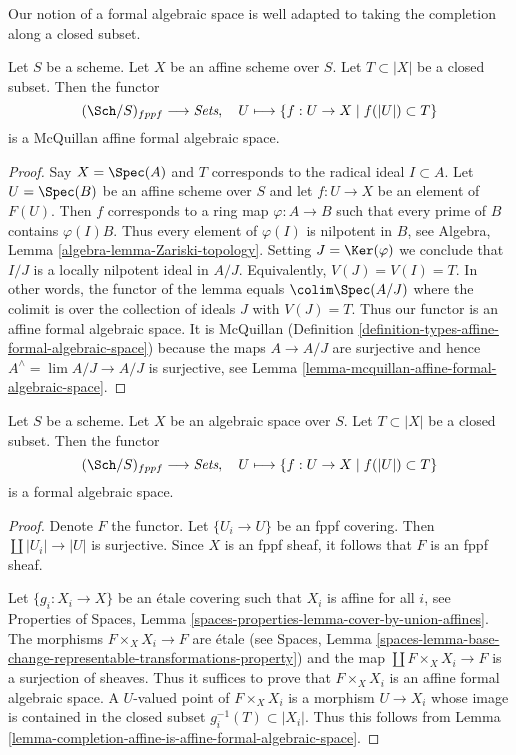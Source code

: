 \noindent
Our notion of a formal algebraic space is well adapted to taking the
completion along a closed subset.

\begin{lemma}
\label{lemma-completion-affine-is-affine-formal-algebraic-space}
Let $S$ be a scheme. Let $X$ be an affine scheme over $S$.
Let $T \subset |X|$ be a closed subset. Then the functor
$$
(\Sch/S)_{fppf} \longrightarrow \textit{Sets},\quad
U \longmapsto \{f : U \to X \mid f(|U|) \subset T\}
$$
is a McQuillan affine formal algebraic space.
\end{lemma}

\begin{proof}
Say $X = \Spec(A)$ and $T$ corresponds to the radical ideal $I \subset A$.
Let $U = \Spec(B)$ be an affine scheme over $S$ and let
$f : U \to X$ be an element of $F(U)$. Then $f$ corresponds to a
ring map $\varphi : A \to B$ such that every prime of $B$ contains
$\varphi(I) B$. Thus every element of $\varphi(I)$ is nilpotent in $B$, see
Algebra, Lemma \ref{algebra-lemma-Zariski-topology}.
Setting $J = \Ker(\varphi)$ we conclude that $I/J$ is a locally nilpotent
ideal in $A/J$. Equivalently, $V(J) = V(I) = T$.
In other words, the functor of the lemma equals
$\colim \Spec(A/J)$ where the colimit is over the
collection of ideals $J$ with $V(J) = T$.
Thus our functor is an affine formal algebraic space. It is McQuillan
(Definition \ref{definition-types-affine-formal-algebraic-space})
because the maps $A \to A/J$ are surjective
and hence $A^\wedge = \lim A/J \to A/J$ is surjective, see
Lemma \ref{lemma-mcquillan-affine-formal-algebraic-space}.
\end{proof}

\begin{lemma}
\label{lemma-completion-is-formal-algebraic-space}
Let $S$ be a scheme. Let $X$ be an algebraic space over $S$.
Let $T \subset |X|$ be a closed subset. Then the functor
$$
(\Sch/S)_{fppf} \longrightarrow \textit{Sets},\quad
U \longmapsto \{f : U \to X \mid f(|U|) \subset T\}
$$
is a formal algebraic space.
\end{lemma}

\begin{proof}
Denote $F$ the functor. Let $\{U_i \to U\}$ be an fppf covering.
Then $\coprod |U_i| \to |U|$ is surjective. Since $X$ is an fppf
sheaf, it follows that $F$ is an fppf sheaf.

\medskip\noindent
Let $\{g_i : X_i \to X\}$ be an \'etale covering such that $X_i$ is affine
for all $i$, see Properties of Spaces, Lemma
\ref{spaces-properties-lemma-cover-by-union-affines}.
The morphisms $F \times_X X_i \to F$ are \'etale
(see Spaces, Lemma
\ref{spaces-lemma-base-change-representable-transformations-property})
and the map $\coprod F \times_X X_i \to F$ is a surjection of sheaves.
Thus it suffices to prove that $F \times_X X_i$ is an affine formal
algebraic space. A $U$-valued point of $F \times_X X_i$ is a
morphism $U \to X_i$ whose image is contained in the closed subset
$g_i^{-1}(T) \subset |X_i|$. Thus this follows from
Lemma \ref{lemma-completion-affine-is-affine-formal-algebraic-space}.
\end{proof}

